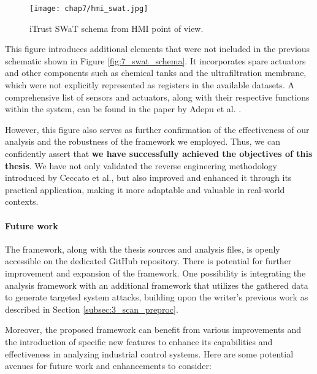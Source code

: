 \begin{figure}[ht]
	\centering
	\texttt{[image: chap7/hmi\_swat.jpg]}
	\caption{iTrust SWaT schema from HMI point of view.}
	\label{fig:7_swat_hmi}
\end{figure}

\bigskip
This figure introduces additional elements that were not included in the previous schematic shown in Figure \ref{fig:7_swat_schema}. It incorporates spare actuators and other components such as chemical tanks and the ultrafiltration membrane, which were not explicitly represented as registers in the available datasets. A comprehensive list of sensors and actuators, along with their respective functions within the system, can be found in the paper by Adepu et al. \cite{swat_dataset2015}.

However, this figure also serves as further confirmation of the effectiveness of our analysis and the robustness of the framework we employed. Thus, we can confidently assert that \textbf{we have successfully achieved the objectives of this thesis}. We have not only validated the reverse engineering methodology introduced by Ceccato et al., but also improved and enhanced it through its practical application, making it more adaptable and valuable in real-world contexts.

\paragraph{Future work}
\label{par:7_futurework}
The framework, along with the thesis sources and analysis files, is openly accessible on the dedicated GitHub repository. There is potential for further improvement and expansion of the framework. One possibility is integrating the analysis framework with an additional framework that utilizes the gathered data to generate targeted system attacks, building upon the writer's previous work as described in Section \ref{subsec:3_scan_preproc}.

Moreover, the proposed framework can benefit from various improvements and the introduction of specific new features to enhance its capabilities and effectiveness in analyzing industrial control systems. Here are some potential avenues for future work and enhancements to consider:

